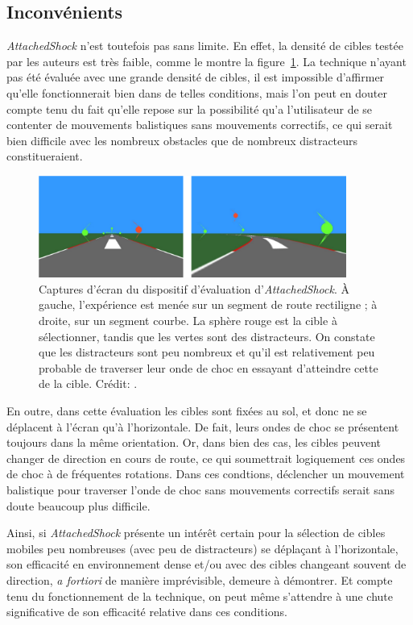 	\subsection{Inconvénients}
	\emph{AttachedShock} n'est toutefois pas sans limite. En effet, la densité de cibles testée par les auteurs est très faible, comme le montre la figure~\ref{fig:asDensity}. La technique n'ayant pas été évaluée avec une grande densité de cibles, il est impossible d'affirmer qu'elle fonctionnerait bien dans de telles conditions, mais l'on peut en douter compte tenu du fait qu'elle repose sur la possibilité qu'a l'utilisateur de se \og contenter \fg{} de mouvements balistiques sans mouvements correctifs, ce qui serait bien difficile avec les nombreux obstacles que de nombreux distracteurs constitueraient.
	
	\begin{figure}[!htb]
		\centering
		\includegraphics[width=0.9\textwidth]{figures/ch2/asDensity}
		\caption[\emph{AttachedShock}, densité de cibles]{Captures d'écran du dispositif d'évaluation d'\emph{AttachedShock}. À gauche, l'expérience est menée sur un segment de route rectiligne ; à droite, sur un segment courbe. La sphère rouge est la cible à sélectionner, tandis que les vertes sont des distracteurs. On constate que les distracteurs sont peu nombreux et qu'il est relativement peu probable de \og traverser \fg{} leur onde de choc en essayant d'atteindre cette de la cible. Crédit: \cite{you2012attachedshock}.}
		\label{fig:asDensity}
	\end{figure}
	
	En outre, dans cette évaluation les cibles sont fixées au sol, et donc ne se déplacent à l'écran qu'à l'horizontale. De fait, leurs ondes de choc se présentent toujours dans la même orientation. Or, dans bien des cas, les cibles peuvent changer de direction en cours de route, ce qui soumettrait logiquement ces ondes de choc à de fréquentes rotations. Dans ces condtions, déclencher un mouvement balistique pour traverser l'onde de choc sans mouvements correctifs serait sans doute beaucoup plus difficile.
	
	Ainsi, si \emph{AttachedShock} présente un intérêt certain pour la sélection de cibles mobiles peu nombreuses (avec peu de distracteurs) se déplaçant à l'horizontale, son efficacité en environnement dense et/ou avec des cibles changeant souvent de direction, \emph{a fortiori} de manière imprévisible, demeure à démontrer. Et compte tenu du fonctionnement de la technique, on peut même s'attendre à une chute significative de son efficacité relative dans ces conditions.

